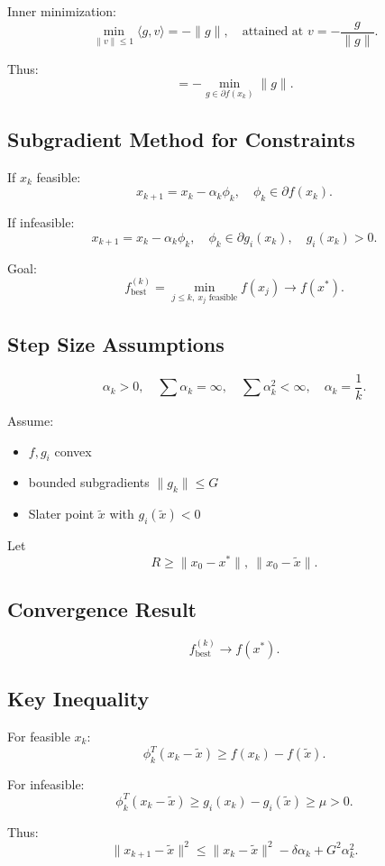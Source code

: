 \documentclass[12pt,oneside]{book}
\numberwithin{equation}{section}
\theoremstyle{definition}
\theoremstyle{plain}
\theoremstyle{remark}
\begin{document}
Inner minimization:
\[
\min_{\|v\|\le1} \langle g,v\rangle
= -\|g\|,
\quad \text{attained at } v = -\frac{g}{\|g\|}.
\]

Thus:
\[
= - \min_{g\in\partial f(x_k)} \|g\|.
\]

\subsection{Subgradient Method for Constraints}

If $x_k$ feasible:
\[
x_{k+1} = x_k - \alpha_k \phi_k,
\quad \phi_k \in \partial f(x_k).
\]

If infeasible:
\[
x_{k+1} = x_k - \alpha_k \phi_k,
\quad \phi_k \in \partial g_i(x_k), \quad g_i(x_k)>0.
\]

Goal:
\[
f_{\text{best}}^{(k)} = \min_{j\le k,\ x_j \text{ feasible}} f(x_j)
\to f(x^*).
\]

\subsection*{Step Size Assumptions}

\[
\alpha_k > 0,
\quad \sum \alpha_k = \infty,
\quad \sum \alpha_k^2 < \infty,
\quad \alpha_k = \frac{1}{k}.
\]

Assume:
\begin{itemize}
\item $f,g_i$ convex
\item bounded subgradients $\|g_k\|\le G$
\item Slater point $\tilde{x}$ with $g_i(\tilde{x})<0$
\end{itemize}

Let
\[
R \ge \|x_0 - x^*\|, \ \|x_0 - \tilde{x}\|.
\]

\subsection*{Convergence Result}

\[
f_{\text{best}}^{(k)} \to f(x^*).
\]

\subsection*{Key Inequality}

For feasible $x_k$:
\[
\phi_k^T (x_k - \tilde{x}) \ge f(x_k) - f(\tilde{x}).
\]

For infeasible:
\[
\phi_k^T (x_k - \tilde{x}) \ge g_i(x_k) - g_i(\tilde{x}) \ge \mu > 0.
\]

Thus:
\[
\|x_{k+1} - \tilde{x}\|^2
\le
\|x_k - \tilde{x}\|^2 - \delta \alpha_k + G^2 \alpha_k^2.
\]
\end{document}

